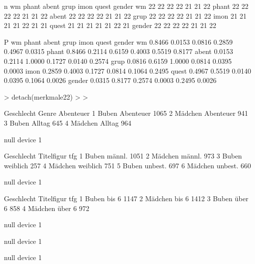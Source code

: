 \begin{Schunk}
\begin{Soutput}
n
       wm phant abent grup imon quest gender
wm     22    22    22   22   21    21     22
phant  22    22    22   22   21    21     22
abent  22    22    22   22   21    21     22
grup   22    22    22   22   21    21     22
imon   21    21    21   21   22    21     21
quest  21    21    21   21   21    22     21
gender 22    22    22   22   21    21     22

P
       wm     phant  abent  grup   imon   quest  gender
wm            0.8466 0.0153 0.0816 0.2859 0.4967 0.0315
phant  0.8466        0.2114 0.6159 0.4003 0.5519 0.8177
abent  0.0153 0.2114        1.0000 0.1727 0.0140 0.2574
grup   0.0816 0.6159 1.0000        0.0814 0.0395 0.0003
imon   0.2859 0.4003 0.1727 0.0814        0.1064 0.2495
quest  0.4967 0.5519 0.0140 0.0395 0.1064        0.0026
gender 0.0315 0.8177 0.2574 0.0003 0.2495 0.0026       
\end{Soutput}
\begin{Sinput}
> detach(merkmale22)
> 
> 
\end{Sinput}
\end{Schunk}


















\begin{Schunk}
\begin{Soutput}
  Geschlecht     Genre Abenteuer
1      Buben Abenteuer      1065
2    Mädchen Abenteuer       941
3      Buben    Alltag       645
4    Mädchen    Alltag       964
\end{Soutput}
\begin{Soutput}
null device 
          1 
\end{Soutput}
\begin{Soutput}
  Geschlecht Titelfigur  tfg
1      Buben     männl. 1051
2    Mädchen     männl.  973
3      Buben   weiblich  257
4    Mädchen   weiblich  751
5      Buben    unbest.  697
6    Mädchen    unbest.  660
\end{Soutput}
\begin{Soutput}
null device 
          1 
\end{Soutput}
\begin{Soutput}
  Geschlecht Titelfigur  tfg
1      Buben      bis 6 1147
2    Mädchen      bis 6 1412
3      Buben     über 6  858
4    Mädchen     über 6  972
\end{Soutput}
\begin{Soutput}
null device 
          1 
\end{Soutput}
\begin{Soutput}
null device 
          1 
\end{Soutput}
\begin{Soutput}
null device 
          1 
\end{Soutput}
\end{Schunk}






